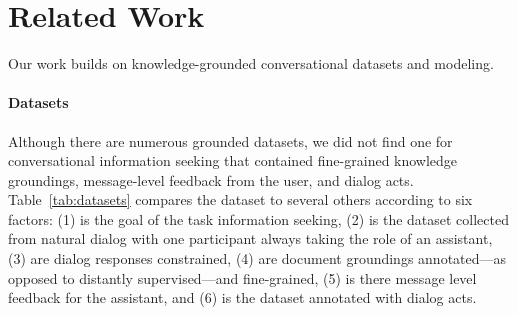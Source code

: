 \section{Related Work}
\label{sec:rel}
Our work builds on knowledge-grounded conversational datasets and modeling.

\paragraph{Datasets} Although there are numerous grounded datasets, we did not find one for conversational information seeking that contained fine-grained knowledge groundings, message-level feedback from the user, and dialog acts.
Table~\ref{tab:datasets} compares the \rover{} dataset to several others according to six factors: (1) is the goal of the task information seeking, (2) is the dataset collected from natural dialog with one participant always taking the role of an assistant, (3) are dialog responses constrained, (4) are document groundings annotated---as opposed to distantly supervised---and fine-grained, (5) is there message level feedback for the assistant, and (6) is the dataset annotated with dialog acts.

